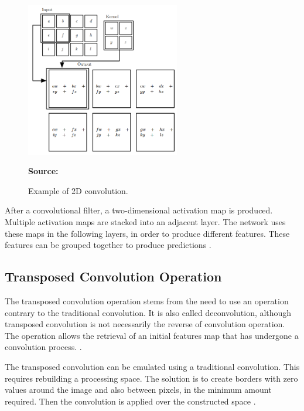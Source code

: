\begin{figure}
  \centering
  \caption{Example of 2D convolution.}
  \includegraphics[width=0.6\textwidth]{imagens/ilustracoes/cap2_convolucao.png}
  \par \textbf{Source: }
  \label{fig:cap2_convolucao}
\end{figure}

After a convolutional filter, a two-dimensional activation map is produced.
Multiple activation maps are stacked into an adjacent layer.
The network uses these maps in the following layers, in order to produce different features.
These features can be grouped together to produce predictions \cite{Albawi:2017} \cite{OShea:2015}.

\subsection{Transposed Convolution Operation}
\label{cap2_deconvolucao}

The transposed convolution operation stems from the need to use an operation contrary to the traditional convolution.
It is also called deconvolution, although transposed convolution is not necessarily the reverse of convolution operation.
The operation allows the retrieval of an initial features map that has undergone a convolution process. \cite{Dumoulin:2016}.

The transposed convolution can be emulated using a traditional convolution.
This requires rebuilding a processing space.
The solution is to create borders with zero values around the image and also between pixels, in the minimum amount required.
Then the convolution is applied over the constructed space \cite{Dumoulin:2016}.

